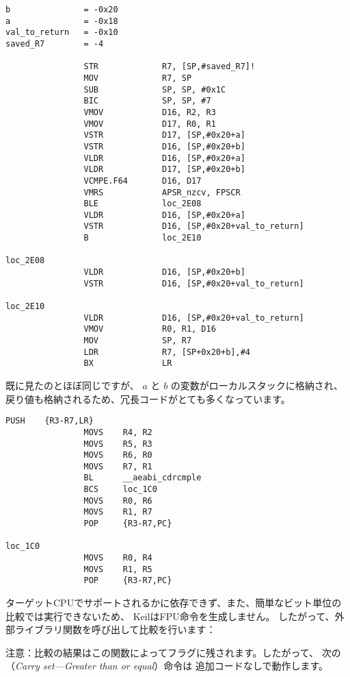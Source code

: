 \begin{lstlisting}[caption=\NonOptimizingXcodeIV (\ARMMode),style=customasmARM]
b               = -0x20
a               = -0x18
val_to_return   = -0x10
saved_R7        = -4

                STR             R7, [SP,#saved_R7]!
                MOV             R7, SP
                SUB             SP, SP, #0x1C
                BIC             SP, SP, #7
                VMOV            D16, R2, R3
                VMOV            D17, R0, R1
                VSTR            D17, [SP,#0x20+a]
                VSTR            D16, [SP,#0x20+b]
                VLDR            D16, [SP,#0x20+a]
                VLDR            D17, [SP,#0x20+b]
                VCMPE.F64       D16, D17
                VMRS            APSR_nzcv, FPSCR
                BLE             loc_2E08
                VLDR            D16, [SP,#0x20+a]
                VSTR            D16, [SP,#0x20+val_to_return]
                B               loc_2E10

loc_2E08
                VLDR            D16, [SP,#0x20+b]
                VSTR            D16, [SP,#0x20+val_to_return]

loc_2E10
                VLDR            D16, [SP,#0x20+val_to_return]
                VMOV            R0, R1, D16
                MOV             SP, R7
                LDR             R7, [SP+0x20+b],#4
                BX              LR
\end{lstlisting}

既に見たのとほぼ同じですが、
$a$ と $b$ の変数がローカルスタックに格納され、戻り値も格納されるため、冗長コードがとても多くなっています。

\myparagraph{\OptimizingKeilVI (\ThumbMode)}

\begin{lstlisting}[caption=\OptimizingKeilVI (\ThumbMode),style=customasmARM]
                PUSH    {R3-R7,LR}
                MOVS    R4, R2
                MOVS    R5, R3
                MOVS    R6, R0
                MOVS    R7, R1
                BL      __aeabi_cdrcmple
                BCS     loc_1C0
                MOVS    R0, R6
                MOVS    R1, R7
                POP     {R3-R7,PC}

loc_1C0
                MOVS    R0, R4
                MOVS    R1, R5
                POP     {R3-R7,PC}
\end{lstlisting}

ターゲットCPUでサポートされるかに依存できず、また、簡単なビット単位の比較では実行できないため、
KeilはFPU命令を生成しません。
したがって、外部ライブラリ関数を呼び出して比較を行います：

注意：比較の結果はこの関数によってフラグに残されます。したがって、
次の（\emph{Carry set---Greater than or equal}）命令は
追加コードなしで動作します。
